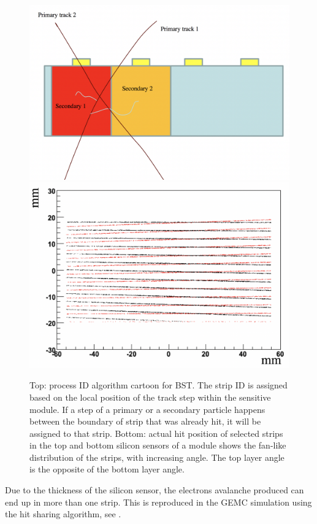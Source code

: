 \begin{figure}
	\centering
	\includegraphics[width=0.95\columnwidth,keepaspectratio]{img/bstHit.png}
	\includegraphics[width=0.95\columnwidth,keepaspectratio]{img/bstStrip.png}
	\caption{Top: process ID algorithm cartoon for BST. The strip ID is assigned based on the local position of the track
            step within the sensitive module. If a step of a primary or a secondary particle happens between the boundary
            of strip that was already hit, it will be assigned to that strip. Bottom: actual hit position of selected
            strips in the top and bottom silicon sensors of a module shows the fan-like distribution of the strips,
            with increasing angle. The top layer angle is the opposite of the bottom layer angle. }
	\label{fig:processID}
\end{figure}

Due to the thickness of the silicon sensor, the electrons avalanche produced can end up in more than one strip. This
is reproduced in the GEMC simulation using the hit sharing algorithm, see .

